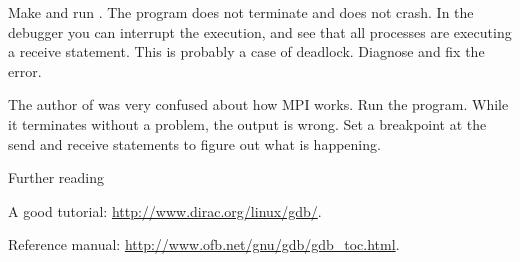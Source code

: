 \begin{exercise}
  Make and run . The program does not terminate and does not crash.
  In the debugger you can interrupt the execution, and see that all processes
  are executing a receive statement. This is probably a case of deadlock.
  Diagnose and fix the error.
\end{exercise}

\begin{exercise}
  The author of  was very confused about how MPI works. Run the program.
  While it terminates without a problem, the output is wrong. Set a breakpoint
  at the send and receive statements to figure out what is happening.
\end{exercise}



 {Further reading}

A good tutorial: \url{http://www.dirac.org/linux/gdb/}.

Reference manual: \url{http://www.ofb.net/gnu/gdb/gdb_toc.html}.

